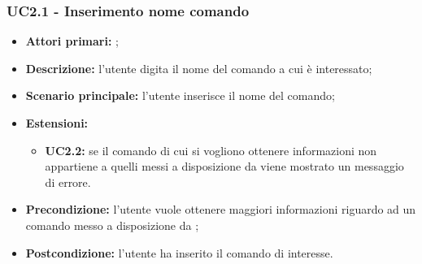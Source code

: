 \subsubsection{UC2.1 - Inserimento nome comando}
\begin{itemize}
	\item \textbf{Attori primari:} \ug{};
	\item \textbf{Descrizione:}  l’utente digita il nome del comando a cui è interessato;
	\item \textbf{Scenario principale:} l’utente inserisce il nome del comando; 
	\item \textbf{Estensioni:} 
	\begin{itemize}
		\item \textbf{UC2.2:} se il comando di cui si vogliono ottenere informazioni non appartiene a quelli messi a disposizione da \ecli{} viene mostrato un messaggio di errore. 
	\end{itemize}
	\item \textbf{Precondizione:} l’utente vuole ottenere maggiori informazioni riguardo ad un comando messo a disposizione da \ecli{}; 
	\item \textbf{Postcondizione:} l’utente ha inserito il comando di interesse.
\end{itemize}